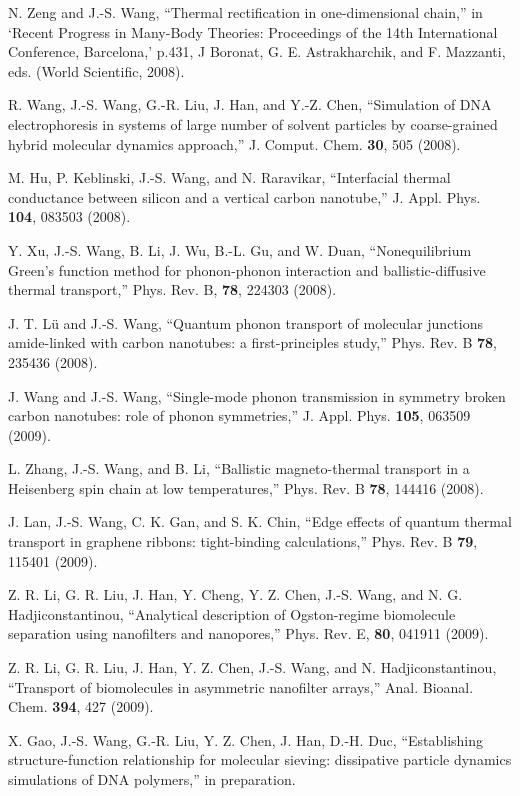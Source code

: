 \itm N. Zeng and J.-S. Wang, ``Thermal rectification in one-dimensional 
chain,'' in `Recent Progress in Many-Body Theories: Proceedings of the 
14th International Conference, Barcelona,' p.431, J Boronat, 
G. E. Astrakharchik, and F. Mazzanti, eds. (World Scientific, 2008). 

\itm R. Wang, J.-S. Wang, G.-R. Liu, J. Han, and Y.-Z. Chen, 
``Simulation of DNA electrophoresis in systems of large number of 
solvent particles by coarse-grained hybrid molecular dynamics approach,'' 
J. Comput. Chem. {\bf 30}, 505 (2008).

\itm M. Hu, P. Keblinski, J.-S. Wang, and N. Raravikar, ``Interfacial 
thermal conductance between silicon and a vertical carbon nanotube,'' 
J. Appl. Phys. {\bf 104}, 083503 (2008).

\itm  Y. Xu, J.-S. Wang, B. Li, J. Wu, B.-L. Gu, and W. Duan, ``Nonequilibrium 
Green's function method for phonon-phonon interaction and  ballistic-diffusive 
thermal transport,'' Phys. Rev. B, {\bf 78}, 224303 (2008).

\itm J. T. L\"u and J.-S. Wang, ``Quantum phonon transport of molecular 
junctions amide-linked with carbon nanotubes: a first-principles study,'' 
Phys. Rev. B {\bf 78}, 235436 (2008).

\itm J. Wang and J.-S. Wang, ``Single-mode phonon transmission in symmetry 
broken carbon nanotubes: role of phonon symmetries,'' 
J. Appl. Phys. {\bf 105}, 063509 (2009). 

\itm L. Zhang, J.-S. Wang, and B. Li, ``Ballistic magneto-thermal transport 
in a Heisenberg spin chain at low temperatures,'' Phys. Rev. B {\bf 78}, 
144416 (2008).

\itm J. Lan, J.-S. Wang, C. K. Gan, and S. K. Chin, 
``Edge effects of quantum thermal transport in graphene ribbons: 
tight-binding calculations,'' Phys. Rev. B {\bf 79}, 115401 (2009).

\itm Z. R. Li, G. R. Liu, J. Han, Y. Cheng, Y. Z. Chen, J.-S. Wang, and 
N. G. Hadjiconstantinou, ``Analytical description of Ogston-regime 
biomolecule separation using nanofilters and nanopores,'' 
Phys. Rev. E, {\bf 80}, 041911 (2009).

\itm Z. R. Li, G. R. Liu, J. Han, Y. Z. Chen, J.-S. Wang, and N. 
Hadjiconstantinou, ``Transport of biomolecules in asymmetric nanofilter 
arrays,'' Anal. Bioanal. Chem. {\bf 394}, 427 (2009).

\itm X. Gao, J.-S. Wang, G.-R. Liu, Y. Z. Chen, J. Han, D.-H. Duc, 
``Establishing structure-function relationship for molecular sieving: 
dissipative particle dynamics simulations of DNA polymers,'' in preparation.

